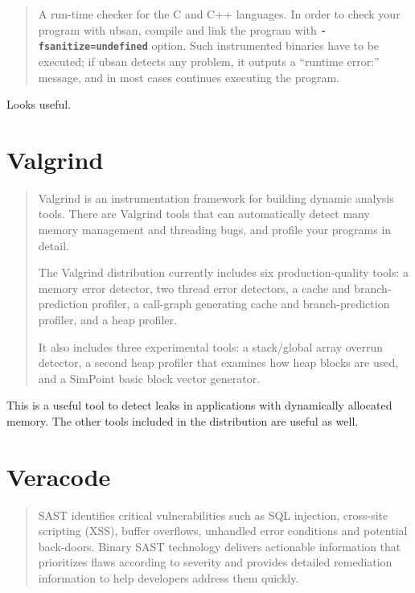\documentclass[12pt]{article}
\let\mytexttt\texttt%
\renewcommand\texttt[1]{\textbf{\mytexttt{#1}}}
\begin{document}
\begin{quote}
A run-time checker for the C and C++ languages. In order to check your
program with ubsan, compile and link the program with \texttt{-fsanitize=undefined}
option. Such instrumented binaries have to be executed; if ubsan detects
any problem, it outputs a “runtime error:” message, and in most cases
continues executing the program.
\end{quote}

\label{ubsan}
Looks useful.
\cite{ubsan}
\section{Valgrind}

\begin{quote}
Valgrind is an instrumentation framework for building dynamic analysis
tools. There are Valgrind tools that can automatically detect many
memory management and threading bugs, and profile your programs in
detail.

The Valgrind distribution currently includes six production-quality
tools: a memory error detector, two thread error detectors, a cache and
branch-prediction profiler, a call-graph generating cache and
branch-prediction profiler, and a heap profiler.
        
It also includes three experimental tools: a stack/global array overrun
detector, a second heap profiler that examines how heap blocks are used,
and a SimPoint basic block vector generator.
\end{quote}

This is a useful tool to detect leaks in applications with dynamically
allocated memory. The other tools included in the distribution are useful
as well.
\cite{valgrind}
\section{Veracode}

\begin{quote}
SAST identifies critical vulnerabilities such as SQL injection,
cross-site scripting (XSS), buffer overflows, unhandled error
conditions and potential back-doors. Binary SAST technology
delivers actionable information that prioritizes flaws according
to severity and provides detailed remediation information to help
developers address them quickly.
\end{quote}
\end{document}
